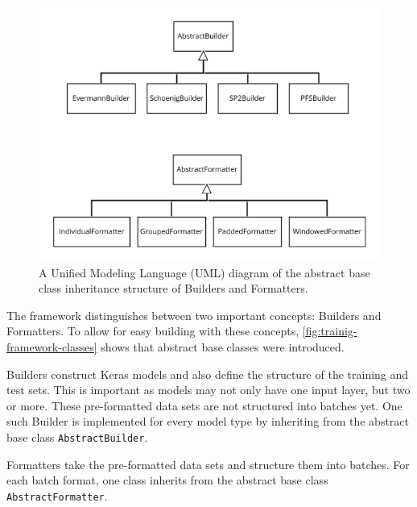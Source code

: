 \begin{figure}
    \centering
    \includegraphics[width=\textwidth]{gfx/training-framework-classes.png}
    \caption{A Unified Modeling Language (UML) diagram of the abstract base class inheritance structure of Builders and Formatters.}
    \label{fig:trainig-framework-classes}
\end{figure}

The framework distinguishes between two important concepts: Builders and Formatters. To allow for easy building with these concepts, \autoref{fig:trainig-framework-classes} shows that abstract base classes were introduced.

Builders construct Keras models and also define the structure of the training and test sets. This is important as models may not only have one input layer, but two or more. These pre-formatted data sets are not structured into batches yet. One such Builder is implemented for every model type by inheriting from the abstract base class \verb=AbstractBuilder=.

Formatters take the pre-formatted data sets and structure them into batches. For each batch format, one class inherits from the abstract base class \verb=AbstractFormatter=.\\

